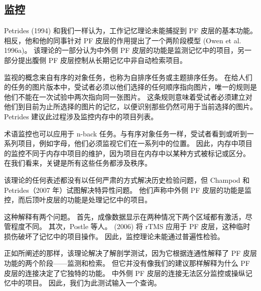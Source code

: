 \subsection{监控}
Petrides (1994) 和我们一样认为，工作记忆理论未能捕捉到 PF 皮层的基本功能。 相反，他和他的同事针对 PF 皮层的作用提出了一个两阶段模型 (Owen et al. 1996a)。 该理论的一部分认为中外侧 PF 皮层的功能是监测记忆中的项目，另一部分提出腹侧 PF 皮层控制从长期记忆中非自动检索项目。
\par 
监视的概念来自有序的对象任务，也称为自排序任务或主题排序任务。 在给人们的任务的图片版本中，受试者必须以他们选择的任何顺序指向图片，唯一的规则是他们不能在一次试验中两次指向同一张图片。 这条规则意味着受试者必须建立对他们到目前为止所选择的图片的记忆，以便识别那些仍然可用于当前选择的图片。 Petrides 建议此过程涉及监控内存中的项目列表。
\par 
术语监控也可以应用于 n-back 任务。与有序对象任务一样，受试者看到或听到一系列项目，例如字母，他们必须监视它们在一系列中的位置。 因此，内存中项目的监控不同于内存中项目的维护，因为项目在内存中以某种方式被标记或区分。 在我们看来，关键是所有这些任务都涉及秩序。
\par 
该理论的任何表述都没有以任何严肃的方式解决历史检验问题，但 Champod 和 Petrides（2007 年）试图解决特异性问题。 他们声称中外侧 PF 皮层的功能是监控，而后顶叶皮层的功能是处理记忆中的项目。
\par 
这种解释有两个问题。 首先，成像数据显示在两种情况下两个区域都有激活，尽管程度不同。 其次，Postle 等人。 (2006) 将 rTMS 应用于 PF 皮层，这种临时损伤破坏了记忆中的项目操作。 因此，监控理论未能通过普遍性检验。
\par 
正如所阐述的那样，该理论解决了解剖学测试，因为它根据连通性解释了 PF 皮层功能的两个阶段——监测和检索。 但它并没有像我们的建议那样解释为什么 PF 皮层的连接决定了它独特的功能。 中外侧 PF 皮层的连接无法区分监控或操纵记忆中的项目。 因此，我们为此测试输入一个查询。
